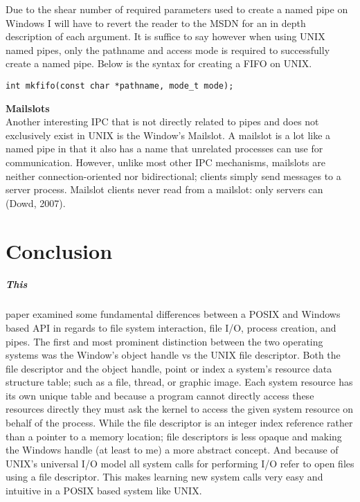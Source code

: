 \documentclass[11pt]{report}
\begin{document}
Due to the shear number of required parameters used to create a named pipe on Windows I will have to revert the reader to the MSDN for an in depth description of each argument. It is suffice to say however when using UNIX named pipes, only the pathname and access mode is required to successfully create a named pipe. Below is the syntax for creating a FIFO on UNIX.

\begin{verbatim}
int mkfifo(const char *pathname, mode_t mode);
\end{verbatim}

\textbf{\large Mailslots}\\
Another interesting IPC that is not directly related to pipes and does not exclusively exist in UNIX is the Window’s Mailslot.  A mailslot is a lot like a named pipe in that it also has a name that  unrelated processes can use for communication. However, unlike most other IPC mechanisms, mailslots are neither connection-oriented nor bidirectional; clients simply send messages to a server process. Mailslot clients never read from a mailslot: only servers can (Dowd, 2007).

\chapter{Conclusion}
\paragraph{This} paper examined some fundamental differences between a POSIX and Windows based API in regards to file system interaction, file I/O, process creation, and pipes. The first and most prominent  distinction between the two operating systems was the Window’s object handle vs the UNIX file descriptor. Both the file descriptor and the object handle, point or index a system’s resource data structure table; such as a file, thread, or graphic image. Each system resource has its own unique table and because a program cannot directly access these resources directly they must ask the kernel to access the given system resource on behalf of the process. While the file descriptor is an integer index reference rather than a pointer to a memory location; file descriptors is less opaque and making the Windows handle (at least to me) a more abstract concept. And because of UNIX’s universal I/O model all system calls for performing I/O refer to open files using a file descriptor. This makes learning new system calls very easy and intuitive in a POSIX based system like UNIX. 
\end{document}
